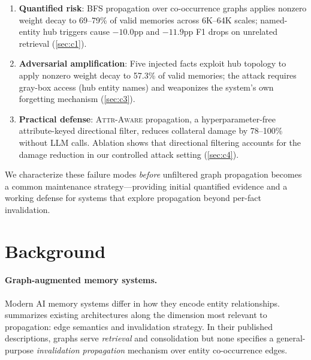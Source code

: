 \documentclass{article}
\newcommand{\attraware}{\textsc{Attr-Aware}}
\begin{document}
\begin{enumerate}
  \item \textbf{Quantified risk}: BFS propagation over co-occurrence graphs applies nonzero weight decay to 69--79\% of valid memories across 6K--64K scales; named-entity hub triggers cause $-10.0$pp and $-11.9$pp F1 drops on unrelated retrieval (\cref{sec:c1}).

  \item \textbf{Adversarial amplification}: Five injected facts exploit hub topology to apply nonzero weight decay to 57.3\% of valid memories; the attack requires gray-box access (hub entity names) and weaponizes the system's own forgetting mechanism (\cref{sec:c3}).

  \item \textbf{Practical defense}: \attraware{} propagation, a hyperparameter-free attribute-keyed directional filter, reduces collateral damage by 78--100\% without LLM calls.
  Ablation shows that directional filtering accounts for the damage reduction in our controlled attack setting (\cref{sec:c4}).
\end{enumerate}

\noindent We characterize these failure modes \textit{before} unfiltered graph propagation becomes a common maintenance strategy---providing initial quantified evidence and a working defense for systems that explore propagation beyond per-fact invalidation.


\section{Background}
\label{sec:background}

\paragraph{Graph-augmented memory systems.}
Modern AI memory systems differ in how they encode entity relationships.
 summarizes existing architectures along the dimension most relevant to propagation: edge semantics and invalidation strategy.
In their published descriptions, graphs serve \textit{retrieval} and consolidation but none specifies a general-purpose \textit{invalidation propagation} mechanism over entity co-occurrence edges.
\end{document}
